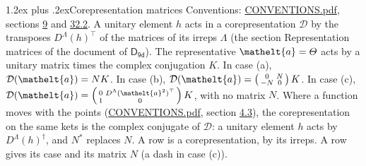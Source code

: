 \documentclass[10pt,a4paper]{article}
\makeatletter
\renewcommand\section{\@startsection{section}{1}{\z@}{-3ex plus -1ex minus -.2ex}%
  {1.2ex plus .2ex}{\normalfont\large\sffamily\bfseries\color{parttitle}}}
\numberwithin{equation}{section}
\newcommand{\eltfont}[1]{{\let\sigma\eltsigma\mathelt{#1}}}
\newcommand{\grp}[1]{\mathsf{#1}}
\newcommand{\elt}[1]{\eltfont{#1}}
\makeatother
\begin{document}
\section{Corepresentation matrices}\label{s:corep_matrices}
Conventions: \href{../../CONVENTIONS.pdf}{CONVENTIONS.pdf}, sections \href{../../../rotation/CONVENTIONS.pdf\#conv.9}{9} and \href{../../CONVENTIONS.pdf\#conv.32.2}{32.2}.
A unitary element $h$ acts in a corepresentation $\mathcal{D}$ by the transposes $D^{\Lambda}(h)^{\top}$ of the matrices of its irreps $\Lambda$ (the section Representation matrices of the document of \href{../../../rotation/data/pdf/D9d.pdf}{$\grp{D_{9d}}$}). The representative $\elt{a} = \varTheta$ acts by a unitary matrix times the complex conjugation $K$.
In case (a), $\mathcal{D}(\elt{a}) = NK$. In case (b), $\mathcal{D}(\elt{a}) = \left(\begin{smallmatrix} 0 & N \\ -N & 0 \end{smallmatrix}\right) K$. In case (c), $\mathcal{D}(\elt{a}) = \left(\begin{smallmatrix} 0 & D^{\Lambda}(\elt{a}^2)^{\top} \\ 1 & 0 \end{smallmatrix}\right) K$, with no matrix $N$.
Where a function moves with the points (\href{../../CONVENTIONS.pdf}{CONVENTIONS.pdf}, section \href{../../../rotation/CONVENTIONS.pdf\#conv.4.3}{4.3}), the corepresentation on the same kets is the complex conjugate of $\mathcal{D}$: a unitary element $h$ acts by $D^{\Lambda}(h)^{\dagger}$, and $N^{*}$ replaces $N$.
A row is a corepresentation, by its irreps. A row gives its case and its matrix $N$ (a dash in case (c)).
\end{document}
